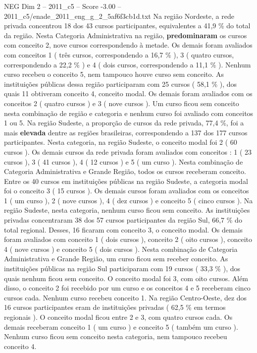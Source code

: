 \begin{textsample}{NEG Dim 2 – 2011\_c5 – Score -3.00 – 2011\_c5/enade\_2011\_eng\_g\_2\_5af6f3cb1d.txt}
Na região Nordeste, a rede privada concentrou 18 dos 43 cursos participantes, equivalentes a 41,9 \% do total da região.
Nesta Categoria Administrativa na região, \textbf{predominaram} os cursos com conceito 2, nove cursos correspondendo à metade.
Os demais foram avaliados com conceitos 1 ( três cursos, correspondendo a 16,7 \% ), 3 ( quatro cursos, correspondendo a 22,2 \% ) e 4 ( dois cursos, correspondendo a 11,1 \% ).
Nenhum curso recebeu o conceito 5, nem tampouco houve curso sem conceito.
As instituições públicas dessa região participaram com 25 cursos ( 58,1 \% ), dos quais 11 obtiveram conceito 4, conceito modal.
Os demais foram avaliados com os conceitos 2 ( quatro cursos ) e 3 ( nove cursos ).
Um curso ficou sem conceito nesta combinação de região e categoria e nenhum curso foi avaliado com conceitos 1 ou 5.
Na região Sudeste, a proporção de cursos da rede privada, 77,4 \%, foi a mais \textbf{elevada} dentre as regiões brasileiras, correspondendo a 137 dos 177 cursos participantes.
Nesta categoria, na região Sudeste, o conceito modal foi 2 ( 60 cursos ).
Os demais cursos da rede privada foram avaliados com conceitos : 1 ( 23 cursos ), 3 ( 41 cursos ), 4 ( 12 cursos ) e 5 ( um curso ).
Nesta combinação de Categoria Administrativa e Grande Região, todos os cursos receberam conceito.
Entre os 40 cursos em instituições públicas na região Sudeste, a categoria modal foi o conceito 3 ( 15 cursos ).
Os demais cursos foram avaliados com os conceitos 1 ( um curso ), 2 ( nove cursos ), 4 ( dez cursos ) e conceito 5 ( cinco cursos ).
Na região Sudeste, nesta categoria, nenhum curso ficou sem conceito.
As instituições privadas concentraram 38 dos 57 cursos participantes da região Sul, 66,7 \% do total regional.
Desses, 16 ficaram com conceito 3, o conceito modal.
Os demais foram avaliados com conceito 1 ( dois cursos ), conceito 2 ( oito cursos ), conceito 4 ( nove cursos ) e conceito 5 ( dois cursos ).
Nesta combinação de Categoria Administrativa e Grande Região, um curso ficou sem receber conceito.
As instituições públicas na região Sul participaram com 19 cursos ( 33,3 \% ), dos quais nenhum ficou sem conceito.
O conceito modal foi 3, com oito cursos.
Além disso, o conceito 2 foi recebido por um curso e os conceitos 4 e 5 receberam cinco cursos cada.
Nenhum curso recebeu conceito 1.
Na região Centro-Oeste, dez dos 16 cursos participantes eram de instituições privadas ( 62,5 \% em termos regionais ).
O conceito modal ficou entre 2 e 3, com quatro cursos cada.
Os demais receberam conceito 1 ( um curso ) e conceito 5 ( também um curso ).
Nenhum curso ficou sem conceito nesta categoria, nem tampouco recebeu conceito 4.

\end{textsample}
